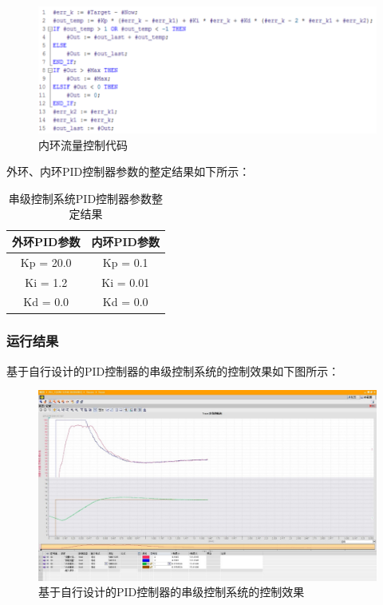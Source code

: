 \documentclass[UTF8]{article}
\begin{document}
\begin{figure}[H]
    \centering %
    \includegraphics[width=1\textwidth]{figure/串级-内环流量-手写-代码.PNG} 
    \caption{内环流量控制代码} %
\end{figure}

外环、内环PID控制器参数的整定结果如下所示：
\begin{table}[H] %
\centering %
\begin{tabular}{cc} %
    \toprule %
    外环PID参数 & 内环PID参数 \\
    \midrule %
    Kp = 20.0 &  Kp = 0.1\\
    Ki = 1.2 & Ki = 0.01 \\
    Kd = 0.0 & Kd = 0.0 \\
    \bottomrule %
\end{tabular}
\caption{串级控制系统PID控制器参数整定结果} %
\end{table}

\subsubsection{运行结果}
基于自行设计的PID控制器的串级控制系统的控制效果如下图所示：
\begin{figure}[H]
    \centering %
    \includegraphics[width=1\textwidth]{figure/串级控制-手写-控制效果.png} 
    \caption{基于自行设计的PID控制器的串级控制系统的控制效果} %
\end{figure}
\end{document}
